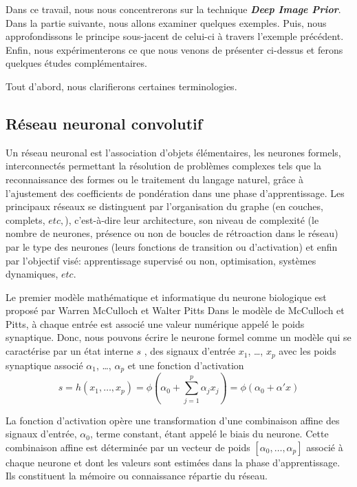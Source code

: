 \documentclass[
  11pt,
  dvipsnames]{article}
\begin{document}
Dans ce travail, nous nous concentrerons sur la technique \textbf{\emph{Deep Image Prior}}.
Dans la partie suivante, nous allons examiner quelques exemples.
Puis, nous approfondissons le principe sous-jacent de celui-ci à travers l'exemple précédent.
Enfin, nous expérimenterons ce que nous venons de présenter ci-dessus
et ferons quelques études complémentaires.

Tout d'abord, nous clarifierons certaines terminologies.

\hypertarget{ruxe9seau-neuronal-convolutif}{%
\subsection{Réseau neuronal convolutif}\label{ruxe9seau-neuronal-convolutif}}

Un réseau neuronal est l'association d'objets élémentaires, les neurones formels, interconnectés
permettant la résolution de problèmes complexes
tels que la reconnaissance des formes ou le traitement du langage naturel,
grâce à l'ajustement des coefficients de pondération dans une phase d'apprentissage.
Les principaux réseaux se distinguent par l'organisation du graphe (en couches, complets, \(etc,\)),
c'est-à-dire leur architecture, son niveau de complexité
(le nombre de neurones, présence ou non de boucles de rétroaction dans le réseau)
par le type des neurones (leurs fonctions de transition ou d'activation)
et enfin par l'objectif visé: apprentissage supervisé ou non, optimisation,
systèmes dynamiques, \(etc.\)

Le premier modèle mathématique et informatique du neurone biologique est proposé par Warren McCulloch et Walter Pitts
Dans le modèle de McCulloch et Pitts, à chaque entrée est associé une valeur numérique appelé le poids synaptique.
Donc, nous pouvons écrire le neurone formel comme un modèle qui se caractérise par
un état interne \(s\) , des signaux d'entrée \(x_{1}\), \dots, \(x_{p}\) avec les poids synaptique associé
\(\alpha_{1}\), \dots, \(\alpha_{p}\) et une fonction d'activation
\[ s=h(x_{1},\dots,x_{p})=\phi(\alpha_{0} + \sum_{j=1}^{p} \alpha_{j}x_{j}) = \phi(\alpha_{0} + \alpha' x)\]

La fonction d'activation opère une transformation d'une combinaison affine
des signaux d'entrée, \(\alpha_{0}\), terme constant, étant appelé le biais du neurone.
Cette combinaison affine est déterminée par un vecteur de poids
\([\alpha_{0},\dots,\alpha_{p}]\) associé à chaque neurone et dont les valeurs sont estimées dans la phase d'apprentissage.
Ils constituent la mémoire ou connaissance répartie du réseau.
\end{document}

